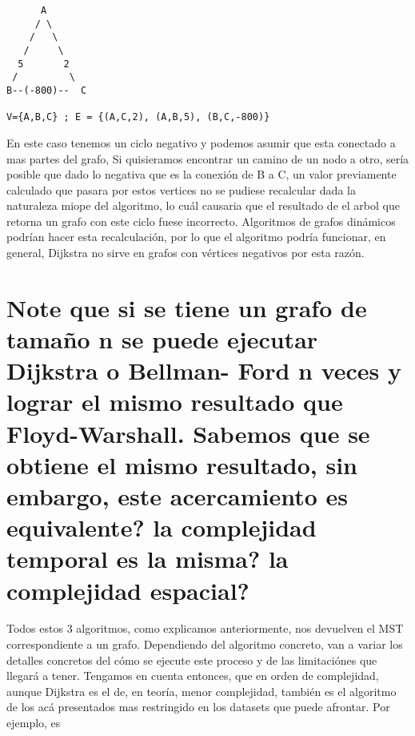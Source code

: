 \documentclass[a4paper]{article}
\begin{document}
\begin{verbatim}
      A
     / \
    /   \
   /     \
  5       2
 /         \
B--(-800)--  C

V={A,B,C} ; E = {(A,C,2), (A,B,5), (B,C,-800)}
\end{verbatim}

En este caso tenemos un ciclo negativo y podemos asumir que esta conectado a mas partes
del grafo,  Si quisieramos encontrar un camino de un nodo a otro, sería 
posible que dado lo negativa que es la conexión de B a C, un valor previamente calculado
que pasara por estos vertices no se pudiese recalcular dada la naturaleza miope
del algoritmo, lo cuál causaria que el resultado de el arbol que retorna un grafo con este
ciclo fuese incorrecto. Algoritmos de grafos dinámicos podrían hacer esta recalculación,
por lo que el algoritmo podría funcionar, en general, Dijkstra no sirve en grafos con
vértices negativos por esta razón.


\section{Note que si se tiene un grafo de tamaño n se puede ejecutar Dijkstra o Bellman-
Ford n veces y lograr el mismo resultado que Floyd-Warshall. Sabemos que
se obtiene el mismo resultado, sin embargo, este acercamiento es equivalente? la
complejidad temporal es la misma? la complejidad espacial?}

Todos estos 3 algoritmos, como explicamos anteriormente, nos devuelven el MST 
correspondiente a un grafo. Dependiendo del algoritmo concreto, van a variar los detalles concretos
del cómo se ejecute este proceso y de las limitaciónes que llegará a tener. Tengamos en cuenta entonces, 
que en orden de complejidad, aunque Dijkstra es el de, en teoría, menor complejidad, también es el algoritmo
de los acá presentados mas restringido en los datasets que puede afrontar. Por ejemplo, es 
\end{document}
